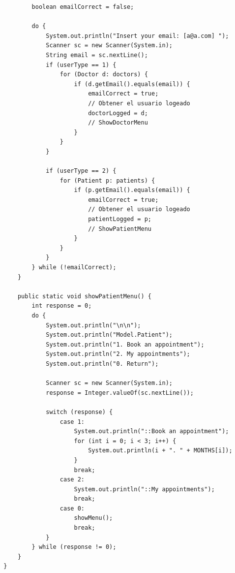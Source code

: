 \documentclass{article}
\begin{document}
\begin{verbatim}
          boolean emailCorrect = false;

          do {
              System.out.println("Insert your email: [a@a.com] ");
              Scanner sc = new Scanner(System.in);
              String email = sc.nextLine();
              if (userType == 1) {
                  for (Doctor d: doctors) {
                      if (d.getEmail().equals(email)) {
                          emailCorrect = true;
                          // Obtener el usuario logeado
                          doctorLogged = d;
                          // ShowDoctorMenu
                      }
                  }
              }

              if (userType == 2) {
                  for (Patient p: patients) {
                      if (p.getEmail().equals(email)) {
                          emailCorrect = true;
                          // Obtener el usuario logeado
                          patientLogged = p;
                          // ShowPatientMenu
                      }
                  }
              }
          } while (!emailCorrect);
      }

      public static void showPatientMenu() {
          int response = 0;
          do {
              System.out.println("\n\n");
              System.out.println("Model.Patient");
              System.out.println("1. Book an appointment");
              System.out.println("2. My appointments");
              System.out.println("0. Return");

              Scanner sc = new Scanner(System.in);
              response = Integer.valueOf(sc.nextLine());

              switch (response) {
                  case 1:
                      System.out.println("::Book an appointment");
                      for (int i = 0; i < 3; i++) {
                          System.out.println(i + ". " + MONTHS[i]);
                      }
                      break;
                  case 2:
                      System.out.println("::My appointments");
                      break;
                  case 0:
                      showMenu();
                      break;
              }
          } while (response != 0);
      }
  }
\end{verbatim}
\end{document}
